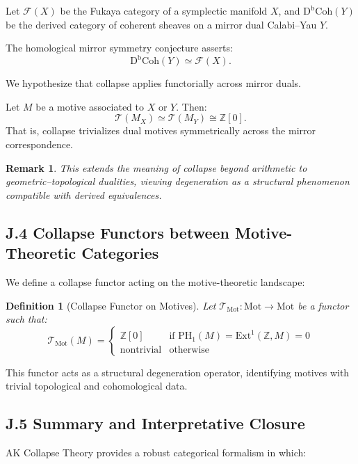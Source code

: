 \documentclass[11pt]{article}
\newtheorem{definition}[theorem]{Definition}
\newtheorem{remark}[theorem]{Remark}
\begin{document}
Let $\mathcal{F}(X)$ be the Fukaya category of a symplectic manifold $X$, and $\mathrm{D^bCoh}(Y)$ be the derived category of coherent sheaves  
on a mirror dual Calabi–Yau $Y$.

The homological mirror symmetry conjecture asserts:
\[
\mathrm{D^bCoh}(Y) \simeq \mathcal{F}(X).
\]

We hypothesize that collapse applies functorially across mirror duals.

\begin{conjecture}
Let $M$ be a motive associated to $X$ or $Y$. Then:
\[
\mathcal{T}(M_X) \simeq \mathcal{T}(M_Y) \cong \mathbb{Z}[0].
\]
That is, collapse trivializes dual motives symmetrically across the mirror correspondence.
\end{conjecture}

\begin{remark}
This extends the meaning of collapse beyond arithmetic to geometric–topological dualities,  
viewing degeneration as a structural phenomenon compatible with derived equivalences.
\end{remark}

\subsection*{J.4 Collapse Functors between Motive-Theoretic Categories}

We define a collapse functor acting on the motive-theoretic landscape:

\begin{definition}[Collapse Functor on Motives]
Let $\mathcal{T}_{\mathrm{Mot}} : \text{Mot} \to \text{Mot}$ be a functor such that:
\[
\mathcal{T}_{\mathrm{Mot}}(M) =
\begin{cases}
\mathbb{Z}[0] & \text{if } \mathrm{PH}_1(M) = \mathrm{Ext}^1(\mathbb{Z}, M) = 0 \\
\text{nontrivial} & \text{otherwise}
\end{cases}
\]
\end{definition}

This functor acts as a structural degeneration operator, identifying motives with trivial topological and cohomological data.

\subsection*{J.5 Summary and Interpretative Closure}

AK Collapse Theory provides a robust categorical formalism in which:
\end{document}
